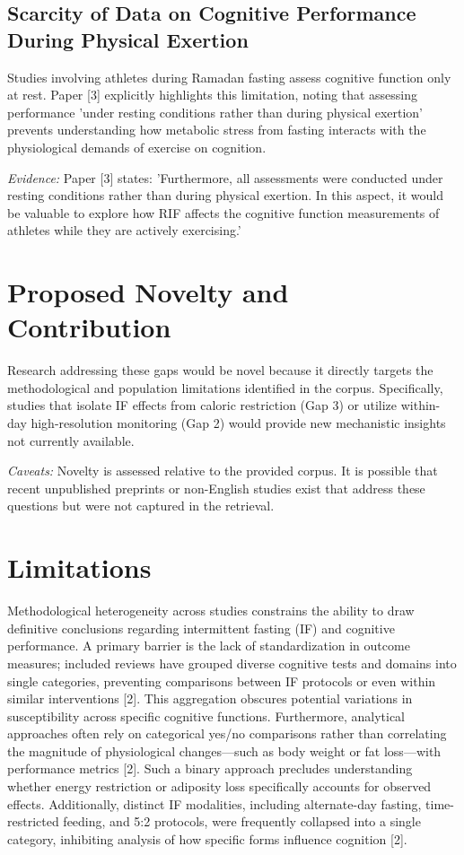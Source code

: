\documentclass[conference]{IEEEtran}
\begin{document}
\subsection{Scarcity of Data on Cognitive Performance During Physical Exertion}
Studies involving athletes during Ramadan fasting assess cognitive function only at rest. Paper [3] explicitly highlights this limitation, noting that assessing performance 'under resting conditions rather than during physical exertion' prevents understanding how metabolic stress from fasting interacts with the physiological demands of exercise on cognition.

\textit{Evidence:} Paper [3] states: 'Furthermore, all assessments were conducted under resting conditions rather than during physical exertion. In this aspect, it would be valuable to explore how RIF affects the cognitive function measurements of athletes while they are actively exercising.'

\section{Proposed Novelty and Contribution}
Research addressing these gaps would be novel because it directly targets the methodological and population limitations identified in the corpus. Specifically, studies that isolate IF effects from caloric restriction (Gap 3) or utilize within-day high-resolution monitoring (Gap 2) would provide new mechanistic insights not currently available.

\textit{Caveats:} Novelty is assessed relative to the provided corpus. It is possible that recent unpublished preprints or non-English studies exist that address these questions but were not captured in the retrieval.

\section{Limitations}
Methodological heterogeneity across studies constrains the ability to draw definitive conclusions regarding intermittent fasting (IF) and cognitive performance. A primary barrier is the lack of standardization in outcome measures; included reviews have grouped diverse cognitive tests and domains into single categories, preventing comparisons between IF protocols or even within similar interventions [2]. This aggregation obscures potential variations in susceptibility across specific cognitive functions. Furthermore, analytical approaches often rely on categorical yes/no comparisons rather than correlating the magnitude of physiological changes—such as body weight or fat loss—with performance metrics [2]. Such a binary approach precludes understanding whether energy restriction or adiposity loss specifically accounts for observed effects. Additionally, distinct IF modalities, including alternate-day fasting, time-restricted feeding, and 5:2 protocols, were frequently collapsed into a single category, inhibiting analysis of how specific forms influence cognition [2].
\end{document}
